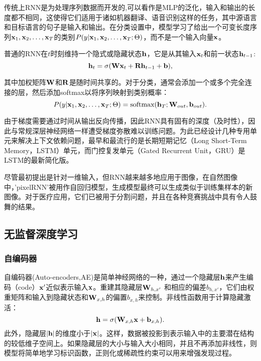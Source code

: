 传统上RNN是为处理序列数据而开发的,可以看作是MLP的泛化，输入和输出的长度都不相同，这使得它们适用于诸如机器翻译、语音识别这样的任务，其中源语言和目标语言的句子是输入和输出。在分类设置中，模型学习了给出一个可变长度序列${\bf x}_{1}, {\bf x}_{2}, \ldots, {\bf x}_{T}$的类别$P(y | {\bf x}_{1}, {\bf x}_{2}, \ldots, {\bf x}_{T}; \Theta)$，而不是一个输入向量${\bf x}$。

普通的RNN在$t$时刻维持一个隐式或隐藏状态${\bf h} $，它是从其输入${\bf x}_{t}$和前一状态${\bf h}_{t-1}$:
\begin{equation}
 {\bf h}_{t} = \sigma({\bf W}{\bf x}_{t} + {\bf R}{\bf h}_{t - 1} + {\bf b}),
\end{equation}

其中加权矩阵${\bf W}$和${\bf R}$是随时间共享的。对于分类，通常会添加一个或多个完全连接的层，然后添加softmax以将序列映射到类别概率： 
\begin{equation}
 P(y | {\bf x}_{1}, {\bf x}_{2}, \ldots, {\bf x}_{T}; \Theta) = \text{softmax}( {\bf h}_{T}; {\bf W}_{out}, {\bf b}_{out}).
\end{equation}

由于梯度需要通过时间从输出反向传播，因此RNN具有固有的深度（及时性），因此与常规深层神经网络一样遭受梯度弥散难以训练问题。为此已经设计几种专用单元来解决上下文依赖问题，最早和最流行的是长期短期记忆（Long Short-Term Memory，LSTM）单元\citep{Hochreiter1997Long}，而门控复发单元（Gated Recurrent Unit，GRU）\citep{Cho2014Learning}是LSTM的最新简化版。

尽管最初提出是针对一维输入，但RNN越来越多地应用于图像，在自然图像中，'pixelRNN'被用作自回归模型，生成模型最终可以生成类似于训练集样本的新图像。对于医疗应用，它们已被用于分割问题，并且在各种竞赛挑战中具有令人鼓舞的结果\citep{Stollenga2015Parallel}。

\subsection{无监督深度学习}
\subsubsection{自编码器}
自编码器(Auto-encoders,AE)是简单神经网络的一种，通过一个隐藏层${\bf h}$来产生编码（code）${\bf x}'$近似表示输入${\bf x}$。重建其隐藏层${\bf W}_{h, x'}$ 和相应的偏差$b_{h, x'}$，它们由权重矩阵和输入到隐藏状态和${\bf W}_{x, h}$的偏置$b_{x, h}$来控制。非线性函数用于计算隐藏激活： 
\begin{equation}
\label{eq::ae_projection}
 {\bf h} = \sigma({\bf W}_{x, h} {\bf x} + {\bf b}_{x, h}).
\end{equation}
此外，隐藏层$|{\bf h}|$的维度小于$|{\bf x}|$。这样，数据被投影到表示输入中的主要潜在结构的较低维子空间上。如果隐藏层的大小与输入大小相同，并且不再添加非线性，则模型将简单地学习标识函数，正则化或稀疏性约束可以用来增强发现过程。

